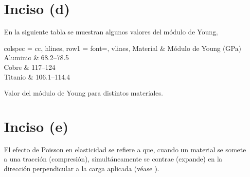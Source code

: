 \documentclass[../main.tex]{subfiles}
\begin{document}
\begin{problema}[3]
	\section{Inciso (d)}

	En la siguiente tabla se muestran algunos valores del módulo de Young,

	\begin{table}[htb]
		\centering
		\begin{tblr}{
				colspec = cc,
				hlines,
				row{1} = {font=\bfseries},
				vlines,
			}
			Material & Módulo de Young (\unit{\GPa})            \\
			Aluminio & \numrange[range-phrase=--]{68.2}{78.5}   \\
			Cobre    & \numrange[range-phrase=--]{117}{124}     \\
			Titanio  & \numrange[range-phrase=--]{106.1}{114.4} \\
		\end{tblr}
		\caption{Valor del módulo de Young para distintos materiales.\cite{Lai-Continuum}}
	\end{table}
	\section{Inciso (e)}

	El efecto de Poisson en elasticidad se refiere a que, cuando un material se somete a
	una tracción (compresión), simultáneamente se contrae (expande) en la dirección perpendicular
	a la carga aplicada \cite{graffChapter6Power2023} (véase ).


\end{problema}
\end{document}
